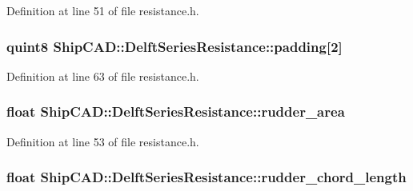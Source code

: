 Definition at line 51 of file resistance.\-h.

\hypertarget{structShipCAD_1_1DelftSeriesResistance_acd08ff15cfab748bf4f54aa65b927950}{
\subsubsection[{padding}]{\setlength{\rightskip}{0pt plus 5cm}quint8 Ship\-C\-A\-D\-::\-Delft\-Series\-Resistance\-::padding\mbox{[}2\mbox{]}}}\label{structShipCAD_1_1DelftSeriesResistance_acd08ff15cfab748bf4f54aa65b927950}


Definition at line 63 of file resistance.\-h.

\hypertarget{structShipCAD_1_1DelftSeriesResistance_a9737974d43a292c58a2e24f7c78c1ffb}{
\subsubsection[{rudder\-\_\-area}]{\setlength{\rightskip}{0pt plus 5cm}float Ship\-C\-A\-D\-::\-Delft\-Series\-Resistance\-::rudder\-\_\-area}}\label{structShipCAD_1_1DelftSeriesResistance_a9737974d43a292c58a2e24f7c78c1ffb}


Definition at line 53 of file resistance.\-h.

\hypertarget{structShipCAD_1_1DelftSeriesResistance_a5a348a92e0ba99368c50f72c81a9b0ff}{
\subsubsection[{rudder\-\_\-chord\-\_\-length}]{\setlength{\rightskip}{0pt plus 5cm}float Ship\-C\-A\-D\-::\-Delft\-Series\-Resistance\-::rudder\-\_\-chord\-\_\-length}}\label{structShipCAD_1_1DelftSeriesResistance_a5a348a92e0ba99368c50f72c81a9b0ff}


